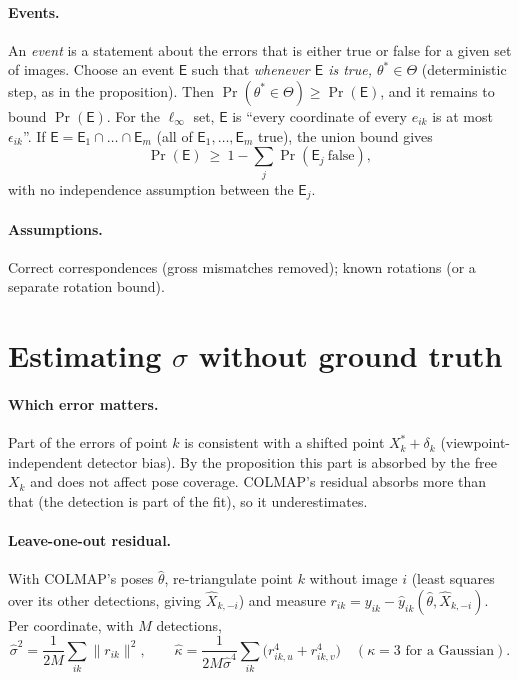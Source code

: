 \documentclass[11pt]{article}
\begin{document}
\paragraph{Events.} An \emph{event} is a statement about the errors that is either true or false for a given set of
images. Choose an event $\mathsf E$ such that \emph{whenever $\mathsf E$ is true, $\theta^*\in\Theta$} (deterministic
step, as in the proposition). Then $\Pr(\theta^*\in\Theta)\ge\Pr(\mathsf E)$, and it remains to bound $\Pr(\mathsf E)$.
For the $\ell_\infty$ set, $\mathsf E$ is ``every coordinate of every $e_{ik}$ is at most $\epsilon_{ik}$''.
If $\mathsf E=\mathsf E_1\cap\dots\cap\mathsf E_m$ (all of $\mathsf E_1,\dots,\mathsf E_m$ true), the union bound gives
\begin{equation}
  \Pr(\mathsf E)\ \ge\ 1-\sum_{j}\Pr(\mathsf E_j\ \text{false}),
  \label{eq:union}
\end{equation}
with no independence assumption between the $\mathsf E_j$.

\paragraph{Assumptions.} Correct correspondences (gross mismatches removed); known rotations (or a separate rotation bound).

\section{Estimating $\sigma$ without ground truth}
\paragraph{Which error matters.} Part of the errors of point $k$ is consistent with a shifted point $X_k^*+\delta_k$
(viewpoint-independent detector bias). By the proposition this part is absorbed by the free $X_k$ and does not affect
pose coverage. COLMAP's residual absorbs more than that (the detection is part of the fit), so it underestimates.

\paragraph{Leave-one-out residual.} With COLMAP's poses $\hat\theta$, re-triangulate point $k$ without image $i$
(least squares over its other detections, giving $\hat X_{k,-i}$) and measure
$r_{ik}=y_{ik}-\hat y_{ik}(\hat\theta,\hat X_{k,-i})$. Per coordinate, with $M$ detections,
\begin{equation}
  \hat\sigma^2=\frac{1}{2M}\sum_{ik}\|r_{ik}\|^2,\qquad
  \hat\kappa=\frac{1}{2M\hat\sigma^4}\sum_{ik}\bigl(r_{ik,u}^4+r_{ik,v}^4\bigr)\quad(\kappa=3\text{ for a Gaussian}).
\end{equation}
\end{document}
